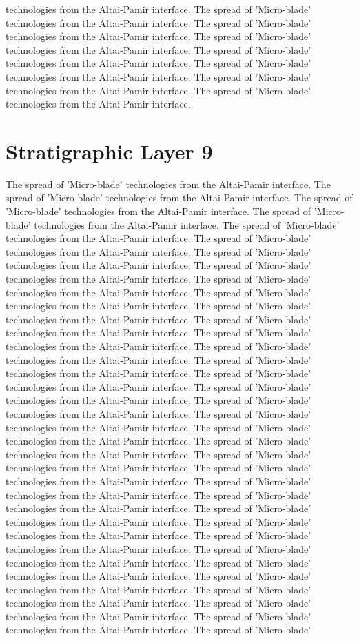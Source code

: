 technologies from the Altai-Pamir interface. The spread of 'Micro-blade' technologies from the Altai-Pamir interface. The spread of 'Micro-blade' technologies from the Altai-Pamir interface. The spread of 'Micro-blade' technologies from the Altai-Pamir interface. The spread of 'Micro-blade' technologies from the Altai-Pamir interface. The spread of 'Micro-blade' technologies from the Altai-Pamir interface. The spread of 'Micro-blade' technologies from the Altai-Pamir interface. The spread of 'Micro-blade' technologies from the Altai-Pamir interface. 

\section{Stratigraphic Layer 9}
The spread of 'Micro-blade' technologies from the Altai-Pamir interface. The spread of 'Micro-blade' technologies from the Altai-Pamir interface. The spread of 'Micro-blade' technologies from the Altai-Pamir interface. The spread of 'Micro-blade' technologies from the Altai-Pamir interface. The spread of 'Micro-blade' technologies from the Altai-Pamir interface. The spread of 'Micro-blade' technologies from the Altai-Pamir interface. The spread of 'Micro-blade' technologies from the Altai-Pamir interface. The spread of 'Micro-blade' technologies from the Altai-Pamir interface. The spread of 'Micro-blade' technologies from the Altai-Pamir interface. The spread of 'Micro-blade' technologies from the Altai-Pamir interface. The spread of 'Micro-blade' technologies from the Altai-Pamir interface. The spread of 'Micro-blade' technologies from the Altai-Pamir interface. The spread of 'Micro-blade' technologies from the Altai-Pamir interface. The spread of 'Micro-blade' technologies from the Altai-Pamir interface. The spread of 'Micro-blade' technologies from the Altai-Pamir interface. The spread of 'Micro-blade' technologies from the Altai-Pamir interface. The spread of 'Micro-blade' technologies from the Altai-Pamir interface. The spread of 'Micro-blade' technologies from the Altai-Pamir interface. The spread of 'Micro-blade' technologies from the Altai-Pamir interface. The spread of 'Micro-blade' technologies from the Altai-Pamir interface. The spread of 'Micro-blade' technologies from the Altai-Pamir interface. The spread of 'Micro-blade' technologies from the Altai-Pamir interface. The spread of 'Micro-blade' technologies from the Altai-Pamir interface. The spread of 'Micro-blade' technologies from the Altai-Pamir interface. The spread of 'Micro-blade' technologies from the Altai-Pamir interface. The spread of 'Micro-blade' technologies from the Altai-Pamir interface. The spread of 'Micro-blade' technologies from the Altai-Pamir interface. The spread of 'Micro-blade' technologies from the Altai-Pamir interface. The spread of 'Micro-blade' technologies from the Altai-Pamir interface. The spread of 'Micro-blade' technologies from the Altai-Pamir interface. The spread of 'Micro-blade' technologies from the Altai-Pamir interface. The spread of 'Micro-blade' technologies from the Altai-Pamir interface. The spread of 'Micro-blade' technologies from the Altai-Pamir interface. The spread of 'Micro-blade' technologies from the Altai-Pamir interface. The spread of 'Micro-blade' 